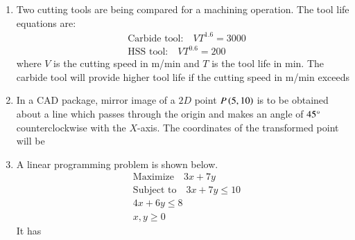 \documentclass[journal]{IEEEtran}
\begin{document}
\begin{enumerate}[leftmargin=0pt]
\item Two cutting tools are being compared for a machining operation. The tool life equations are:
\begin{align*}
&\text{Carbide tool:}\quad VT^{1.6} = 3000 \\
&\text{HSS tool:}\quad VT^{0.6} = 200
\end{align*}
where $V$ is the cutting speed in m/min and $T$ is the tool life in min. The carbide tool will provide higher tool life if the cutting speed in m/min exceeds
\begin{enumerate}
\end{enumerate}
\hfill{}

\item In a CAD package, mirror image of a $2D$ point $P\left(5,10\right)$ is to be obtained about a line which passes through the origin and makes an angle of $45\degree$ counterclockwise with the $X$-axis. The coordinates of the transformed point will be
\begin{enumerate}
\end{enumerate}
\hfill{}

\item A linear programming problem is shown below.
\begin{align*}
&\text{Maximize}\quad 3x + 7y \\
&\text{Subject to}\quad 3x + 7y \leq 10 \\
&4x + 6y \leq 8 \\
&x, y \geq 0
\end{align*}
It has
\begin{enumerate}
\end{enumerate}
\hfill{}


\end{enumerate}
\end{document}
